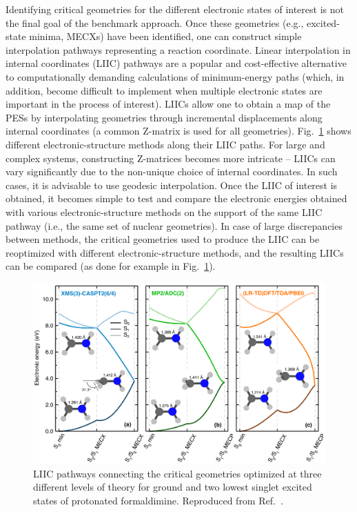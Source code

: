 \documentclass[9pt,bestpractices]{livecoms}
\begin{document}
Identifying critical geometries for the different electronic states of interest is not the final goal of the benchmark approach. Once these geometries (e.g., excited-state minima, MECXs) have been identified, one can construct simple interpolation pathways representing a reaction coordinate. Linear interpolation in internal coordinates (LIIC) pathways are a popular and cost-effective alternative to computationally demanding calculations of minimum-energy paths (which, in addition, become difficult to implement when multiple electronic states are important in the process of interest).\cite{hudock_ab_2007} LIICs allow one to obtain a map of the PESs by interpolating geometries through incremental displacements along internal coordinates (a common Z-matrix is used for all geometries). Fig.~\ref{fig:liic_jack} shows different electronic-structure methods along their LIIC paths. For large and complex systems, constructing Z-matrices becomes more intricate -- LIICs can vary significantly due to the non-unique choice of internal coordinates. In such cases, it is advisable to use geodesic interpolation.\cite{zhu2019geodesic} Once the LIIC of interest is obtained, it becomes simple to test and compare the electronic energies obtained with various electronic-structure methods on the support of the same LIIC pathway (i.e., the same set of nuclear geometries). In case of large discrepancies between methods, the critical geometries used to produce the LIIC can be reoptimized with different electronic-structure methods, and the resulting LIICs can be compared (as done for example in Fig.~\ref{fig:liic_jack}). 

\begin{figure}[h!]
    \centering
    \includegraphics[width=0.8\linewidth]{./figures/jack_liic.png}
    \caption{LIIC pathways connecting the critical geometries optimized at three different levels of theory for ground and two lowest singlet excited states of protonated formaldimine. Reproduced from Ref.~.}
    \label{fig:liic_jack}
\end{figure}
\end{document}
